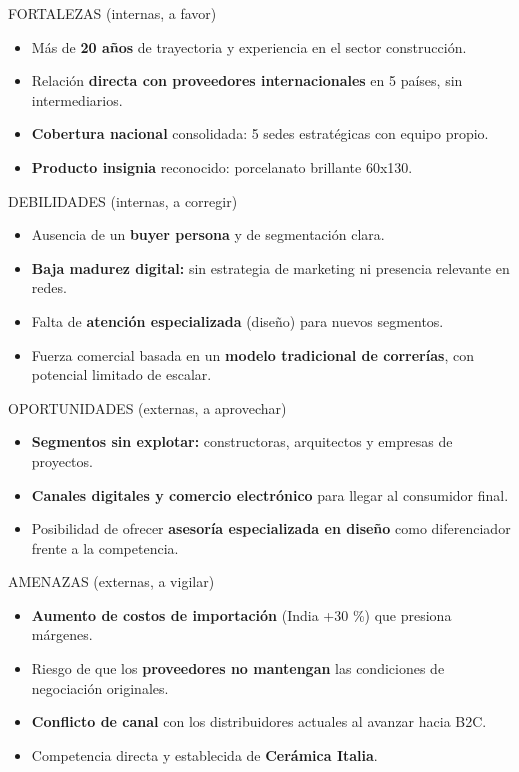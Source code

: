 \documentclass[11pt,a4paper]{article}
\begin{document}
\begin{tcbraster}[raster columns=2, raster equal height=rows, raster column skip=3mm, raster row skip=3mm]
\begin{fodaF}{FORTALEZAS (internas, a favor)}
\begin{itemize}
\item
  Más de \textbf{20 años} de trayectoria y experiencia en el sector
  construcción.
\item
  Relación \textbf{directa con proveedores internacionales} en 5 países,
  sin intermediarios.
\item
  \textbf{Cobertura nacional} consolidada: 5 sedes estratégicas con
  equipo propio.
\item
  \textbf{Producto insignia} reconocido: porcelanato brillante 60x130.
\end{itemize}
\end{fodaF}
\begin{fodaD}{DEBILIDADES (internas, a corregir)}
\begin{itemize}
\item
  Ausencia de un \textbf{buyer persona} y de segmentación clara.
\item
  \textbf{Baja madurez digital:} sin estrategia de marketing ni
  presencia relevante en redes.
\item
  Falta de \textbf{atención especializada} (diseño) para nuevos
  segmentos.
\item
  Fuerza comercial basada en un \textbf{modelo tradicional de
  correrías}, con potencial limitado de escalar.
\end{itemize}
\end{fodaD}
\begin{fodaO}{OPORTUNIDADES (externas, a aprovechar)}
\begin{itemize}
\item
  \textbf{Segmentos sin explotar:} constructoras, arquitectos y empresas
  de proyectos.
\item
  \textbf{Canales digitales y comercio electrónico} para llegar al
  consumidor final.
\item
  Posibilidad de ofrecer \textbf{asesoría especializada en diseño} como
  diferenciador frente a la competencia.
\end{itemize}
\end{fodaO}
\begin{fodaA}{AMENAZAS (externas, a vigilar)}
\begin{itemize}
\item
  \textbf{Aumento de costos de importación} (India +30 \%) que presiona
  márgenes.
\item
  Riesgo de que los \textbf{proveedores no mantengan} las condiciones de
  negociación originales.
\item
  \textbf{Conflicto de canal} con los distribuidores actuales al avanzar
  hacia B2C.
\item
  Competencia directa y establecida de \textbf{Cerámica Italia}.
\end{itemize}
\end{fodaA}
\end{tcbraster}
\end{document}
